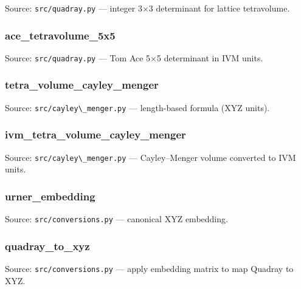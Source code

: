 \documentclass[
  10pt,
]{article}
\newcommand{\passthrough}[1]{#1}
\renewcommand{\texttt}[1]{%
    \colorbox{codebg}{\color{codefg}\ttfamily #1}%
}
\begin{document}
Source: \passthrough{\lstinline!src/quadray.py!} --- integer 3×3
determinant for lattice tetravolume.

\hypertarget{code:ace_tetravolume_5x5}{%
\subsubsection{\texorpdfstring{\texttt{ace\_tetravolume\_5x5}}{ace\_tetravolume\_5x5}}\label{code:ace_tetravolume_5x5}}

Source: \passthrough{\lstinline!src/quadray.py!} --- Tom Ace 5×5
determinant in IVM units.

\hypertarget{code:tetra_volume_cayley_menger}{%
\subsubsection{\texorpdfstring{\texttt{tetra\_volume\_cayley\_menger}}{tetra\_volume\_cayley\_menger}}\label{code:tetra_volume_cayley_menger}}

Source: \passthrough{\lstinline!src/cayley\_menger.py!} --- length-based
formula (XYZ units).

\hypertarget{code:ivm_tetra_volume_cayley_menger}{%
\subsubsection{\texorpdfstring{\texttt{ivm\_tetra\_volume\_cayley\_menger}}{ivm\_tetra\_volume\_cayley\_menger}}\label{code:ivm_tetra_volume_cayley_menger}}

Source: \passthrough{\lstinline!src/cayley\_menger.py!} ---
Cayley--Menger volume converted to IVM units.

\hypertarget{code:urner_embedding}{%
\subsubsection{\texorpdfstring{\texttt{urner\_embedding}}{urner\_embedding}}\label{code:urner_embedding}}

Source: \passthrough{\lstinline!src/conversions.py!} --- canonical XYZ
embedding.

\hypertarget{code:quadray_to_xyz}{%
\subsubsection{\texorpdfstring{\texttt{quadray\_to\_xyz}}{quadray\_to\_xyz}}\label{code:quadray_to_xyz}}

Source: \passthrough{\lstinline!src/conversions.py!} --- apply embedding
matrix to map Quadray to XYZ.
\end{document}
